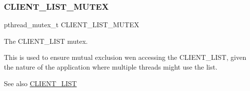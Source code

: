 \subsubsection{\texorpdfstring{C\+L\+I\+E\+N\+T\+\_\+\+L\+I\+S\+T\+\_\+\+M\+U\+T\+EX}{CLIENT\_LIST\_MUTEX}}
{\footnotesize\ttfamily pthread\+\_\+mutex\+\_\+t C\+L\+I\+E\+N\+T\+\_\+\+L\+I\+S\+T\+\_\+\+M\+U\+T\+EX}



The {\ttfamily C\+L\+I\+E\+N\+T\+\_\+\+L\+I\+ST} mutex. 

This is used to ensure mutual exclusion wen accessing the {\ttfamily C\+L\+I\+E\+N\+T\+\_\+\+L\+I\+ST}, given the nature of the application where multiple threads might use the list.

\begin{DoxySeeAlso}{See also}
\hyperlink{zip-zop-server_8c_a32076dcdfaf1057a014d74d01cc7e08e}{C\+L\+I\+E\+N\+T\+\_\+\+L\+I\+ST} 
\end{DoxySeeAlso}
